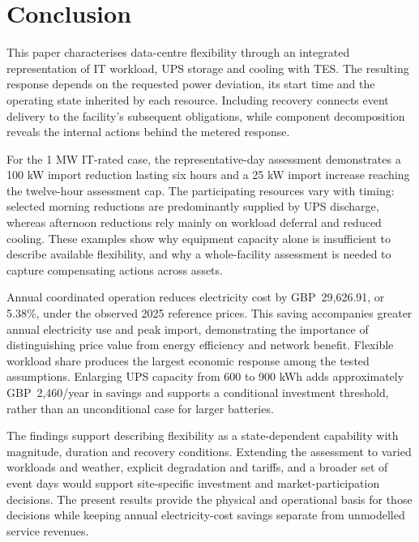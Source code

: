 \section{Conclusion}
\label{sec:conclusion}
This paper characterises data-centre flexibility through an integrated representation of IT workload, UPS storage and cooling with TES. The resulting response depends on the requested power deviation, its start time and the operating state inherited by each resource. Including recovery connects event delivery to the facility's subsequent obligations, while component decomposition reveals the internal actions behind the metered response.

For the 1 MW IT-rated case, the representative-day assessment demonstrates a 100 kW import reduction lasting six hours and a 25 kW import increase reaching the twelve-hour assessment cap. The participating resources vary with timing: selected morning reductions are predominantly supplied by UPS discharge, whereas afternoon reductions rely mainly on workload deferral and reduced cooling. These examples show why equipment capacity alone is insufficient to describe available flexibility, and why a whole-facility assessment is needed to capture compensating actions across assets.

Annual coordinated operation reduces electricity cost by GBP~29,626.91, or 5.38\%, under the observed 2025 reference prices. This saving accompanies greater annual electricity use and peak import, demonstrating the importance of distinguishing price value from energy efficiency and network benefit. Flexible workload share produces the largest economic response among the tested assumptions. Enlarging UPS capacity from 600 to 900 kWh adds approximately GBP~2,460/year in savings and supports a conditional investment threshold, rather than an unconditional case for larger batteries.

The findings support describing flexibility as a state-dependent capability with magnitude, duration and recovery conditions. Extending the assessment to varied workloads and weather, explicit degradation and tariffs, and a broader set of event days would support site-specific investment and market-participation decisions. The present results provide the physical and operational basis for those decisions while keeping annual electricity-cost savings separate from unmodelled service revenues.
